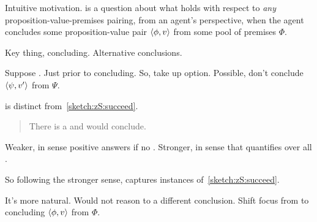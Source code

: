 \begin{note}
  {
    \color{blue}
    Intuitive motivation.
  }
  \qzS{} is a question about what holds with respect to \emph{any} proposition-value-premises pairing, from an agent's perspective, when the agent concludes some proposition-value pair \(\langle \phi, v \rangle\) from some pool of premises \(\Phi\).

  Key thing, concluding.
  Alternative conclusions.

  Suppose \requ{}.
  Just prior to concluding.
  So, take up option.
  Possible, don't conclude \(\langle \psi, v' \rangle\) from \(\Psi\).
\end{note}

\begin{note}
  \qzS{} is distinct from~\autoref{sketch:zS:succeed}.

  \begin{quote}
    There is a \requ{} and would conclude.
  \end{quote}

  Weaker, in sense positive answers if no \requ{}.
  Stronger, in sense that quantifies over all \requ{}.

  So following the stronger sense, \qzS{} captures instances of~\autoref{sketch:zS:succeed}.

  It's more natural.
  Would not reason to a different conclusion.
  Shift focus from \requ{} to concluding \(\langle \phi, v \rangle\) from \(\Phi\).
\end{note}

